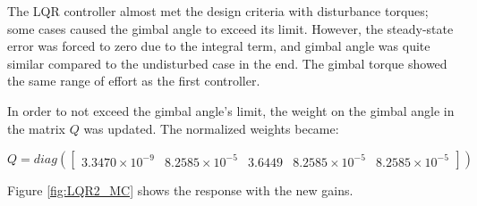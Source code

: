 \documentclass[]{aiaa-tc}%
\begin{document}
	The LQR controller almost met the design criteria with disturbance torques; some cases caused the gimbal angle to exceed its limit. However, the steady-state error was forced to zero due to the integral term, and gimbal angle was quite similar compared to the undisturbed case in the end. The gimbal torque showed the same range of effort as the first controller. 

	\vspace{5 mm}

	In order to not exceed the gimbal angle's limit, the weight on the gimbal angle in the matrix $Q$ was updated. The normalized weights became:

	\vspace{5 mm}

{\centering
 $Q=diag(\begin{bmatrix}
3.3470\times10^{-9} & 8.2585\times10^{-5} & 3.6449 & 8.2585\times10^{-5} & 8.2585\times10^{-5}
\end{bmatrix})$\par
}

	\vspace{5 mm}

Figure \ref{fig:LQR2_MC} shows the response with the new gains.
\end{document}
